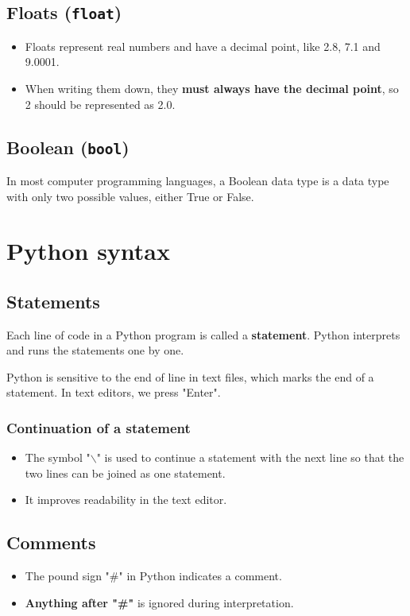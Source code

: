 \documentclass[11pt]{article}
\begin{document}
\subsection{Floats (\texttt{float})}
\label{sec:orgb10581f}
\begin{itemize}
\item Floats represent real numbers and have a decimal point, like 2.8, 7.1 and 9.0001.
\item When writing them down, they \textbf{must always have the decimal point}, so 2 should be represented as 2.0.
\end{itemize}

\subsection{Boolean (\texttt{bool})}
\label{sec:orge2ce29d}
In most computer programming languages, a Boolean data type is a data type with only two possible values, either True or False.

 \newpage

\section{Python syntax}
\label{sec:orgcb3151b}

\subsection{Statements}
\label{sec:orgdab9331}
Each line of code in a Python program is called a \textbf{statement}. Python interprets and runs the statements one by one.

Python is sensitive to the end of line in text files, which marks the end of a statement. In text editors, we press "Enter".

\subsubsection{Continuation of a statement}
\label{sec:org9adc69a}
\begin{itemize}
\item The symbol "$\backslash$" is used to continue a statement with the next line so that the two lines can be joined as one statement.
\item It improves readability in the text editor.
\end{itemize}

\subsection{Comments}
\label{sec:org0076b47}
\begin{itemize}
\item The pound sign "\#" in Python indicates a comment.
\item \textbf{Anything after "\#"} is ignored during interpretation.
\end{itemize}
\end{document}
